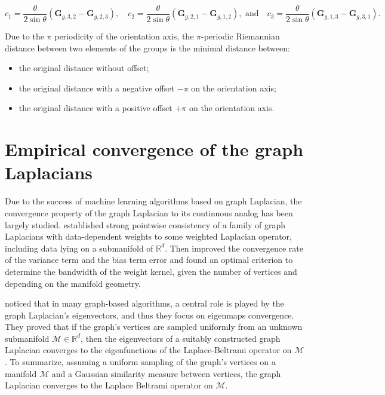 \documentclass{article}
\newcommand{\haguettaz}[1]{{\color[rgb]{.8,.3,.2}{#1}}}
\begin{document}
\begin{equation}
c_1 = \frac{\theta}{2 \sin \theta} ( \boldsymbol{G}_{g, 3, 2} - \boldsymbol{G}_{g, 2, 3})
, \quad
c_2 = \frac{\theta}{2 \sin \theta} ( \boldsymbol{G}_{g, 2, 1} - \boldsymbol{G}_{g, 1, 2})
, \text{ and} \quad
c_3 = \frac{\theta}{2 \sin \theta} ( \boldsymbol{G}_{g, 1, 3} - \boldsymbol{G}_{g, 3, 1}).
\end{equation}

Due to the $\pi$ periodicity of the orientation axis, the $\pi$-periodic Riemannian distance between two elements of the groups is the minimal distance between:
\begin{itemize}
\item the original distance without offset;
\item the original distance with a negative offset $-\pi$ on the orientation axis;
\item the original distance with a positive offset $+\pi$ on the orientation axis.
\end{itemize}

\clearpage
\section{Empirical convergence of the graph Laplacians} \label{sec:practical_convergence}

\haguettaz{introduce empirical convergence}

Due to the success of machine learning algorithms based on graph Laplacian, the convergence property of the graph Laplacian to its continuous analog has been largely studied. \cite{hein2005graphs} established strong pointwise consistency of a family of graph Laplacians with data-dependent weights to some weighted Laplacian operator, including data lying on a submanifold of $\mathbb{R}^d$. Then \cite{singer2006graph} improved the convergence rate of the variance term and the bias term error and found an optimal criterion to determine the bandwidth of the weight kernel, given the number of vertices and depending on the manifold geometry. 

\cite{belkin2006convergence} noticed that in many graph-based algorithms, a central role is played by the graph Laplacian's eigenvectors, and thus they focus on eigenmaps convergence. They proved that if the graph's vertices are sampled uniformly from an unknown submanifold $\mathcal{M} \in \mathbb{R}^d$, then the eigenvectors of a suitably constructed graph Laplacian converges to the eigenfunctions of the Laplace-Beltrami operator on $\mathcal{M}$. To summarize, assuming a uniform sampling of the graph's vertices on a manifold $\mathcal{M}$ and a Gaussian similarity measure between vertices, the graph Laplacian converges to the Laplace Beltrami operator on $\mathcal{M}$.
\end{document}
